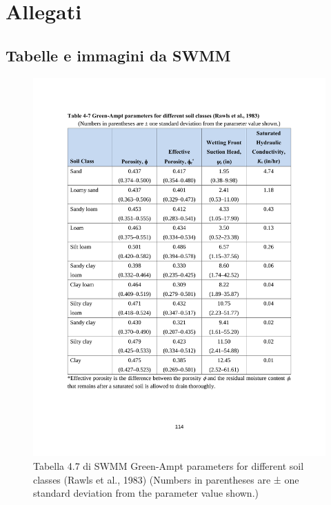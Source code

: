 \appendix
\chapter{Allegati}
\label{appendix:SWMM}
\section{Tabelle e immagini da SWMM}
%
\begin{figure}[H]
    \centering
    \includegraphics[trim=2.5cm 4.5cm 2.5cm 3.6cm,clip,width=\textwidth]{IMG/table4-7_Ks.pdf} 
    \caption[Tabella 4.7 di SWMM]{Tabella 4.7 di SWMM Green-Ampt parameters for different soil classes (Rawls et al., 1983) (Numbers in parentheses are ± one standard deviation from the parameter value shown.)}
    \label{SWMM:tabella4-7}
\end{figure}

